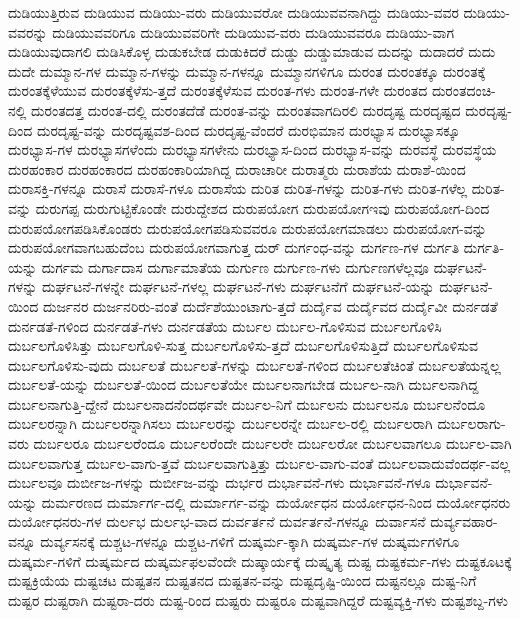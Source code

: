 {ದುಡಿಯುತ್ತಿರುವ
ದುಡಿಯುವ
ದುಡಿಯು-ವರು
ದುಡಿಯುವರೋ
ದುಡಿಯುವವನಾಗಿದ್ದು
ದುಡಿಯು-ವವರ
ದುಡಿಯು-ವವರನ್ನು
ದುಡಿಯುವವರಿಗೂ
ದುಡಿಯುವವರಿಗೇ
ದುಡಿಯುವ-ವರು
ದುಡಿಯುವವರೂ
ದುಡಿಯು-ವಾಗ
ದುಡಿಯುವುದಾಗಲಿ
ದುಡಿಸಿಕೊಳ್ಳ
ದುಡುಕಬೇಡ
ದುಡುಕಿದರೆ
ದುಡ್ಡು
ದುಡ್ಡುಮಾಡುವ
ದುದನ್ನು
ದುದಾದರೆ
ದುದು
ದುದೇ
ದುಮ್ಮಾನ-ಗಳ
ದುಮ್ಮಾನ-ಗಳನ್ನು
ದುಮ್ಮಾನ-ಗಳನ್ನೂ
ದುಮ್ಮಾನಗಳಿಗೂ
ದುರಂತ
ದುರಂತಕ್ಕೂ
ದುರಂತಕ್ಕೆ
ದುರಂತಕ್ಕೆಳೆಯುವ
ದುರಂತಕ್ಕೆಳೆಸು-ತ್ತದೆ
ದುರಂತಕ್ಕೆಳೆಸುವ
ದುರಂತ-ಗಳು
ದುರಂತ-ಗಳೇ
ದುರಂತದ
ದುರಂತದಂಚಿ-ನಲ್ಲಿ
ದುರಂತದತ್ತ
ದುರಂತ-ದಲ್ಲಿ
ದುರಂತದೆಡೆ
ದುರಂತ-ವನ್ನು
ದುರಂತವಾಗದಿರಲಿ
ದುರದೃಷ್ಟ
ದುರದೃಷ್ಟದ
ದುರದೃಷ್ಟ-ದಿಂದ
ದುರದೃಷ್ಟ-ವನ್ನು
ದುರದೃಷ್ಟವಶ-ದಿಂದ
ದುರದೃಷ್ಟ-ವೆಂದರೆ
ದುರಭಿಮಾನ
ದುರಭ್ಯಾಸ
ದುರಭ್ಯಾಸಕ್ಕೂ
ದುರಭ್ಯಾಸ-ಗಳ
ದುರಭ್ಯಾಸಗಳೆಂದು
ದುರಭ್ಯಾಸಗಳೇನು
ದುರಭ್ಯಾಸ-ದಿಂದ
ದುರಭ್ಯಾಸ-ವನ್ನು
ದುರವಸ್ಥೆ
ದುರವಸ್ಥೆಯ
ದುರಹಂಕಾರ
ದುರಹಂಕಾರದ
ದುರಹಂಕಾರಿಯಾಗಿದ್ದ
ದುರಾಚಾರೀ
ದುರಾತ್ಮರು
ದುರಾಶೆಯ
ದುರಾಶೆ-ಯಿಂದ
ದುರಾಸಕ್ತಿ-ಗಳನ್ನೂ
ದುರಾಸೆ
ದುರಾಸೆ-ಗಳೂ
ದುರಾಸೆಯ
ದುರಿತ
ದುರಿತ-ಗಳನ್ನು
ದುರಿತ-ಗಳು
ದುರಿತ-ಗಳೆಲ್ಲ
ದುರಿತ-ವನ್ನು
ದುರುಗಪ್ಪ
ದುರುಗುಟ್ಟಿಕೊಂಡೇ
ದುರುದ್ದೇಶದ
ದುರುಪಯೋಗ
ದುರುಪಯೋಗಇವು
ದುರುಪಯೋಗ-ದಿಂದ
ದುರುಪಯೋಗಪಡಿಸಿಕೊಂಡರು
ದುರುಪಯೋಗಪಡಿಸುವವರೂ
ದುರುಪಯೋಗಮಾಡಲು
ದುರುಪಯೋಗ-ವನ್ನು
ದುರುಪಯೋಗವಾಗಬಹುದೆಂಬ
ದುರುಪಯೋಗವಾಗುತ್ತ
ದುರ್
ದುರ್ಗಂಧ-ವನ್ನು
ದುರ್ಗಣ-ಗಳ
ದುರ್ಗತಿ
ದುರ್ಗತಿ-ಯನ್ನು
ದುರ್ಗಮ
ದುರ್ಗಾದಾಸ
ದುರ್ಗಾಮಾತೆಯ
ದುರ್ಗುಣ
ದುರ್ಗುಣ-ಗಳು
ದುರ್ಗುಣಗಳೆಲ್ಲವೂ
ದುರ್ಘಟನೆ-ಗಳನ್ನು
ದುರ್ಘಟನೆ-ಗಳನ್ನೇ
ದುರ್ಘಟನೆ-ಗಳಲ್ಲ
ದುರ್ಘಟನೆ-ಗಳು
ದುರ್ಘಟನೆಗೆ
ದುರ್ಘಟನೆ-ಯನ್ನು
ದುರ್ಘಟನೆ-ಯಿಂದ
ದುರ್ಜನರ
ದುರ್ಜನರಿರು-ವಂತೆ
ದುರ್ದೆಶೆಯುಂಟಾಗು-ತ್ತದೆ
ದುರ್ದೈವ
ದುರ್ದೈವದ
ದುರ್ದೈವೀ
ದುರ್ನಡತೆ
ದುರ್ನಡತೆ-ಗಳಿಂದ
ದುರ್ನಡತೆ-ಗಳು
ದುರ್ನಡತೆಯ
ದುರ್ಬಲ
ದುರ್ಬಲ-ಗೊಳಿಸುವ
ದುರ್ಬಲಗೊಳಿಸಿ
ದುರ್ಬಲಗೊಳಿಸಿತ್ತು
ದುರ್ಬಲಗೊಳಿ-ಸುತ್ತ
ದುರ್ಬಲಗೊಳಿಸು-ತ್ತದೆ
ದುರ್ಬಲಗೊಳಿಸುತ್ತಿದೆ
ದುರ್ಬಲಗೊಳಿಸುವ
ದುರ್ಬಲಗೊಳಿಸು-ವುದು
ದುರ್ಬಲತೆ
ದುರ್ಬಲತೆ-ಗಳನ್ನು
ದುರ್ಬಲತೆ-ಗಳಿಂದ
ದುರ್ಬಲತೆಚಿಂತೆ
ದುರ್ಬಲತೆಯನ್ನಲ್ಲ
ದುರ್ಬಲತೆ-ಯನ್ನು
ದುರ್ಬಲತೆ-ಯಿಂದ
ದುರ್ಬಲತೆಯೇ
ದುರ್ಬಲನಾಗಬೇಡ
ದುರ್ಬಲ-ನಾಗಿ
ದುರ್ಬಲನಾಗಿದ್ದ
ದುರ್ಬಲನಾಗುತ್ತಿ-ದ್ದೇನೆ
ದುರ್ಬಲನಾದನೆಂದರ್ಥವೇ
ದುರ್ಬಲ-ನಿಗೆ
ದುರ್ಬಲನು
ದುರ್ಬಲನೂ
ದುರ್ಬಲನೆಂದೂ
ದುರ್ಬಲರನ್ನಾಗಿ
ದುರ್ಬಲರನ್ನಾಗಿಸಲು
ದುರ್ಬಲರನ್ನು
ದುರ್ಬಲರನ್ನೇ
ದುರ್ಬಲ-ರಲ್ಲಿ
ದುರ್ಬಲರಾಗಿ
ದುರ್ಬಲರಾಗು-ವರು
ದುರ್ಬಲರೂ
ದುರ್ಬಲರೆಂದೂ
ದುರ್ಬಲರೆಂದೇ
ದುರ್ಬಲರೇ
ದುರ್ಬಲರೋ
ದುರ್ಬಲವಾಗಲೂ
ದುರ್ಬಲ-ವಾಗಿ
ದುರ್ಬಲವಾಗುತ್ತ
ದುರ್ಬಲ-ವಾಗು-ತ್ತವೆ
ದುರ್ಬಲವಾಗುತ್ತಿತ್ತು
ದುರ್ಬಲ-ವಾಗು-ವಂತೆ
ದುರ್ಬಲವಾದುವೆಂದರ್ಥ-ವಲ್ಲ
ದುರ್ಬಲವೂ
ದುರ್ಬೀಜ-ಗಳನ್ನು
ದುರ್ಬೀಜ-ವನ್ನು
ದುರ್ಭರ
ದುರ್ಭಾವನೆ-ಗಳು
ದುರ್ಭಾವನೆ-ಗಳೂ
ದುರ್ಭಾವನೆ-ಯನ್ನು
ದುರ್ಮರಣದ
ದುರ್ಮಾರ್ಗ-ದಲ್ಲಿ
ದುರ್ಮಾರ್ಗ-ವನ್ನು
ದುರ್ಯೋಧನ
ದುರ್ಯೋಧನ-ನಿಂದ
ದುರ್ಯೋಧನರು
ದುರ್ಯೋಧನರು-ಗಳ
ದುರ್ಲಭ
ದುರ್ಲಭ-ವಾದ
ದುರ್ವರ್ತನೆ
ದುರ್ವರ್ತನೆ-ಗಳನ್ನೂ
ದುರ್ವಾಸನೆ
ದುರ್ವ್ಯವಹಾರ-ವನ್ನೂ
ದುರ್ವ್ಯಸನಕ್ಕೆ
ದುಶ್ಚಟ-ಗಳನ್ನೂ
ದುಶ್ಚಟ-ಗಳಿಗೆ
ದುಷ್ಕರ್ಮ-ಕ್ಕಾಗಿ
ದುಷ್ಕರ್ಮ-ಗಳ
ದುಷ್ಕರ್ಮಗಳಿಗೂ
ದುಷ್ಕರ್ಮ-ಗಳಿಗೆ
ದುಷ್ಕರ್ಮದ
ದುಷ್ಕರ್ಮಫಲವೆಂದೇ
ದುಷ್ಕಾರ್ಯಕ್ಕೆ
ದುಷ್ಕೃತ್ಯ
ದುಷ್ಟ
ದುಷ್ಟಕರ್ಮ-ಗಳು
ದುಷ್ಟಕೂಟಕ್ಕೆ
ದುಷ್ಟಕ್ರಿಯೆಯ
ದುಷ್ಟಚಟ
ದುಷ್ಟತನ
ದುಷ್ಟತನದ
ದುಷ್ಟತನ-ವನ್ನು
ದುಷ್ಟದೃಷ್ಟಿ-ಯಿಂದ
ದುಷ್ಟನಲ್ಲೂ
ದುಷ್ಟ-ನಿಗೆ
ದುಷ್ಟರ
ದುಷ್ಟರಾಗಿ
ದುಷ್ಟರಾ-ದರು
ದುಷ್ಟ-ರಿಂದ
ದುಷ್ಟರು
ದುಷ್ಟರೂ
ದುಷ್ಟವಾಗಿದ್ದರೆ
ದುಷ್ಟವ್ಯಕ್ತಿ-ಗಳು
ದುಷ್ಟಶಬ್ದ-ಗಳು
}
